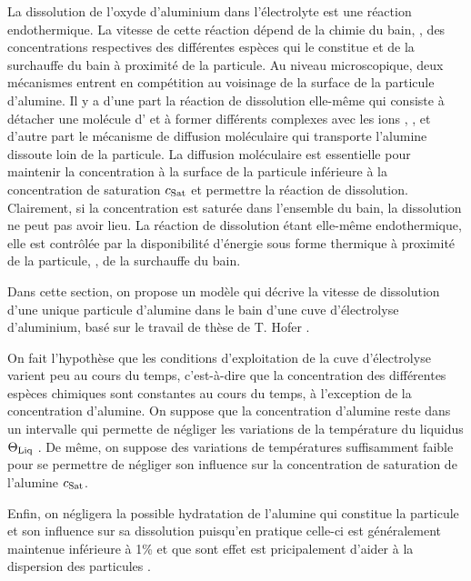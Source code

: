La dissolution de l'oxyde d'aluminium dans l'électrolyte est une réaction
endothermique. La vitesse de cette réaction dépend de la chimie du
bain, \ie, des concentrations respectives des différentes espèces qui
le constitue et de la surchauffe du bain à proximité de la
particule. Au niveau microscopique, deux mécanismes entrent en
compétition au voisinage de la surface de la particule d'alumine. Il y a
d'une part la réaction de dissolution elle-même qui consiste à
détacher une molécule d' et à former différents complexes
avec les ions  \cite{Haupin1995}, \cite{Kvande1986}, et
d'autre part le mécanisme de diffusion moléculaire qui transporte
l'alumine dissoute loin de la particule. La diffusion moléculaire est
essentielle pour maintenir la concentration à la surface de la
particule inférieure à la concentration de saturation $c_\text{Sat}$ et
permettre la réaction de dissolution. Clairement, si la concentration
est saturée dans l'ensemble du bain, la dissolution ne peut pas avoir
lieu. La réaction de dissolution étant elle-même endothermique, elle
est contrôlée par la disponibilité d'énergie sous forme thermique à
proximité de la particule, \ie, de la surchauffe du bain.

Dans cette section, on propose un modèle qui décrive la vitesse de
dissolution d'une unique particule d'alumine dans le bain d'une cuve
d'électrolyse d'aluminium, basé sur le travail de thèse de T. Hofer
\cite{Hofer2011}.

On fait l'hypothèse que les conditions d'exploitation de la cuve
d'électrolyse varient peu au cours du temps, c'est-à-dire que la
concentration des différentes espèces chimiques sont constantes au
cours du temps, à l'exception de la concentration d'alumine. On
suppose que la concentration d'alumine reste dans un intervalle qui
permette de négliger les variations de la température du liquidus
$\Theta_\text{Liq}$ \cite{Skybakmoen1997}. De même, on suppose des variations de températures
suffisamment faible pour se permettre de négliger son influence sur
la concentration de saturation de l'alumine $c_\text{Sat}$.

Enfin, on négligera la possible hydratation de l'alumine qui constitue
la particule et son influence sur sa dissolution puisqu'en pratique
celle-ci est généralement maintenue inférieure à \num{1}\% et que sont
effet est pricipalement d'aider à la dispersion des particules
\cite{Fini2017}.

